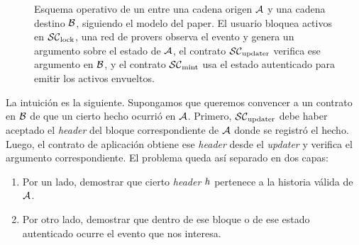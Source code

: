 \begin{figure}[!t]
	\caption{Esquema operativo de un \zkBridge entre una cadena origen $\mathcal{A}$ y una cadena destino $\mathcal{B}$, siguiendo el modelo del paper. El usuario bloquea activos en $\mathcal{SC}_{\mathrm{lock}}$, una red de provers observa el evento y genera un argumento \ZK sobre el estado de $\mathcal{A}$, el contrato $\mathcal{SC}_{\mathrm{updater}}$ verifica ese argumento en $\mathcal{B}$, y el contrato $\mathcal{SC}_{\mathrm{mint}}$ usa el estado autenticado para emitir los activos envueltos.}
	\label{fig:zkbridge-simplified}
\end{figure}

La intuición es la siguiente. Supongamos que queremos convencer a un contrato en $\mathcal{B}$ de que un cierto hecho ocurrió en $\mathcal{A}$. Primero, $\mathcal{SC}_{\mathrm{updater}}$ debe haber aceptado el \textit{header} del bloque correspondiente de $\mathcal{A}$ donde se registró el hecho. Luego, el contrato de aplicación obtiene ese \textit{header} desde el \textit{updater} y verifica el argumento \ZK correspondiente. El problema queda así separado en dos capas:
\begin{enumerate}[noitemsep]
		\item Por un lado, demostrar que cierto \textit{header} $h$ pertenece a la historia válida de $\mathcal{A}$.
	\item Por otro lado, demostrar que dentro de ese bloque o de ese estado autenticado ocurre el evento que nos interesa.
\end{enumerate}

